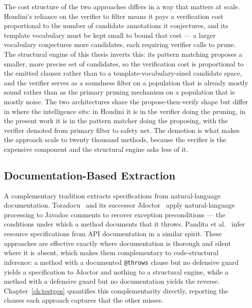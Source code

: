 The cost structure of the two approaches differs in a way that matters at scale.
Houdini's reliance on the verifier to filter means it pays a verification cost
proportional to the number of candidate annotations it conjectures, and its
template vocabulary must be kept small to bound that cost --- a larger vocabulary
conjectures more candidates, each requiring verifier calls to prune. The structural
engine of this thesis inverts this: its pattern matching proposes a smaller, more
precise set of candidates, so the verification cost is proportional to the
emitted clauses rather than to a template-vocabulary-sized candidate space, and the
verifier serves as a soundness filter on a population that is already mostly sound
rather than as the primary pruning mechanism on a population that is mostly noise.
The two architectures share the propose-then-verify shape but differ in where the
intelligence sits: in Houdini it is in the verifier doing the pruning, in the
present work it is in the pattern matcher doing the proposing, with the verifier
demoted from primary filter to safety net. The demotion is what makes the approach
scale to twenty thousand methods, because the verifier is the expensive component
and the structural engine asks less of it.

\subsection{Documentation-Based Extraction}

A complementary tradition extracts specifications from natural-language
documentation. Toradocu~\cite{toradocu2016} and its successor
Jdoctor~\cite{jdoctor2018} apply natural-language processing to Javadoc
comments to recover exception preconditions --- the conditions under which a
method documents that it throws. Pandita et al.~\cite{pandita2012inferring}
infer resource specifications from API documentation in a similar spirit.
These approaches are effective exactly where documentation is thorough and
silent where it is absent, which makes them complementary to code-structural
inference: a method with a documented \texttt{@throws} clause but no defensive
guard yields a specification to Jdoctor and nothing to a structural engine,
while a method with a defensive guard but no documentation yields the reverse.
Chapter~\ref{ch:testgen} quantifies this complementarity directly, reporting
the clauses each approach captures that the other misses.

